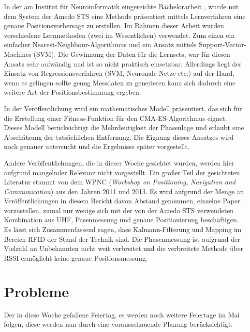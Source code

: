\documentclass[a4paper,12pt,fleqn]{scrartcl}
\begin{document}
In der am Institut für Neuroinformatik eingereichte Bachelorarbeit \cite{Muz1}, wurde mit dem System der Amedo STS eine Methode präsentiert mittels Lernverfahren eine genaue Positionsvorhersage zu erstellen. Im Rahmen dieser Arbeit wurden verschiedene Lernmethoden (zwei im Wesentlichen) verwendet. Zum einen ein einfacher Nearest-Neighbour-Algorithmus und ein Ansatz mittels Support-Vector-Machines (SVM). Die Gewinnung der Daten für die Lernsets, war für diesen Ansatz sehr aufwändig und ist so nicht praktisch einsetzbar. Allerdings liegt der Einsatz von Regressionsverfahren (SVM, Neuronale Netze etc.) auf der Hand, wenn es gelingen sollte genug Messdaten zu generieren kann sich dadurch eine weitere Art der Positionsbestimmung ergeben. 

In der Veröffentlichung \cite{Wil1} wird ein mathematisches Modell präsentiert, das sich für die Erstellung einer Fitness-Funktion für den CMA-ES-Algorithmus eignet. Dieses Modell berücksichtigt die Mehrdeutigkeit der Phasenlage und erlaubt eine Abschätzung der tatsächlichen Entfernung. Die Eignung dieses Ansatzes wird noch genauer untersucht und die Ergebnisse später vorgestellt.

Andere Veröffentlichungen, die in dieser Woche gesichtet wurden, werden hier aufgrund mangelnder Relevanz nicht vorgestellt. Ein großer Teil der gesichteten Literatur stammt von dem WPNC (\textit{Workshop on Positioning, Navigation and Communication}) aus den Jahren 2011 und 2013. Es wird aufgrund der Menge an Veröffentlichungen in diesem Bericht davon Abstand genommen, einzelne Paper vorzustellen, zumal nur wenige sich mit der von der Amedo STS verwendeten Kombination aus UHF, Pasenmessung und genaue Positionierung beschäftigen. Es lässt sich Zusammenfassend sagen, dass Kalmann-Filterung und Mapping im Bereich RFID der Stand der Technik sind. Die Phasenmessung ist aufgrund der Vielzahl an Unbekannten nicht weit verbreitet und die verbreitete Methode über RSSI ermöglicht keine genaue Positionsmessung.

\section[Probleme]{Probleme}
Der in diese Woche gefallene Feiertag, es werden noch weitere Feiertage im Mai folgen, diese werden nun durch eine vorausschauende Planung berücksichtigt.



\newpage


\end{document}

